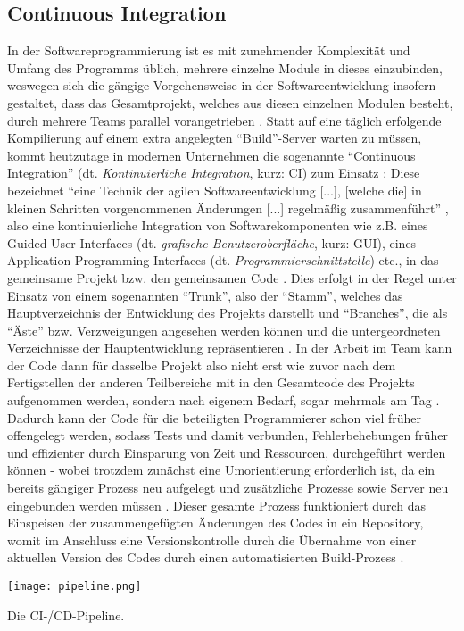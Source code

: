 \subsection{Continuous Integration}
In der Softwareprogrammierung ist es mit zunehmender Komplexität und Umfang des Programms üblich, mehrere einzelne Module in dieses einzubinden, weswegen sich die gängige Vorgehensweise in der Softwareentwicklung insofern gestaltet, dass das Gesamtprojekt,
welches aus diesen einzelnen Modulen besteht, durch mehrere Teams parallel vorangetrieben \cite{HJL:2018aa}. Statt auf eine täglich erfolgende Kompilierung auf einem extra angelegten \enquote{Build}-Server warten zu müssen, kommt heutzutage in modernen
Unternehmen die sogenannte \enquote{Continuous Integration} (dt. \textit{Kontinuierliche Integration}, kurz: CI) zum Einsatz \cite{HJL:2018aa}: Diese bezeichnet \enquote{eine Technik der agilen Softwareentwicklung [...], [welche die] in kleinen Schritten vorgenommenen Änderungen [...] 
regelmäßig zusammenführt} \cite{Dirk:2018aa}, also eine kontinuierliche Integration von Softwarekomponenten wie z.B. eines Guided User Interfaces (dt. \textit{grafische Benutzeroberfläche}, kurz: GUI), eines Application Programming Interfaces (dt. \textit{Programmierschnittstelle}) etc.,
in das gemeinsame Projekt bzw. den gemeinsamen Code \cite{HJL:2018aa}. Dies erfolgt in der Regel unter Einsatz von einem sogenannten \enquote{Trunk}, also der \enquote{Stamm}, welches das Hauptverzeichnis der Entwicklung des Projekts darstellt  und \enquote{Branches}, die als 
\enquote{Äste} bzw. Verzweigungen angesehen werden können und die untergeordneten Verzeichnisse der Hauptentwicklung repräsentieren \cite{Peters:2015aa}. \newline In der Arbeit im Team kann der Code dann für dasselbe Projekt also nicht erst wie zuvor nach dem Fertigstellen der anderen 
Teilbereiche mit in den Gesamtcode des Projekts aufgenommen werden, sondern nach eigenem Bedarf, sogar mehrmals am Tag \cite{Dirk:2018aa}. Dadurch kann der Code für die beteiligten Programmierer schon viel früher offengelegt werden, sodass Tests und damit verbunden, Fehlerbehebungen früher 
und effizienter durch Einsparung von Zeit und Ressourcen, durchgeführt werden können - wobei trotzdem zunächst eine Umorientierung erforderlich ist, da ein bereits gängiger Prozess neu aufgelegt und zusätzliche Prozesse sowie Server neu eingebunden werden müssen \cite{HJL:2018aa, Dirk:2018aa}. 
Dieser gesamte Prozess funktioniert durch das Einspeisen der zusammengefügten Änderungen des Codes in ein Repository, womit im Anschluss eine Versionskontrolle durch die Übernahme von einer aktuellen Version des Codes durch einen automatisierten Build-Prozess \cite{HJL:2018aa}.
\begin{marginfigure}[-1\baselineskip] %
    \texttt{[image: pipeline.png]}
    \caption{\label{fig:pipeline}Die CI-/CD-Pipeline.}
\end{marginfigure}

